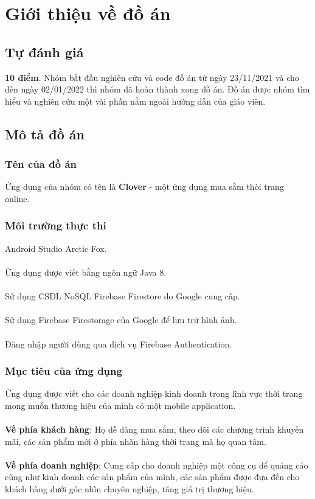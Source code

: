 \documentclass[12pt]{article}
\begin{document}
\section{Giới thiệu về đồ án}
\subsection{Tự đánh giá}
\textbf{10 điểm}. Nhóm bắt đầu nghiên cứu và code đồ án từ ngày 23/11/2021 và cho đến ngày 02/01/2022 thì nhóm đã hoàn thành xong đồ án. Đồ án được nhóm tìm hiểu và nghiên cứu một vài phần nằm ngoài hướng dẫn của giáo viên.

\subsection{Mô tả đồ án}
\subsubsection{Tên của đồ án}

Ứng dụng của nhóm có tên là \textbf{Clover} - một ứng dụng mua sắm thòi trang online.

\subsubsection{Môi trường thực thi}
Android Studio Arctic Fox.\\\\
\indent Ứng dụng được viết bằng ngôn ngữ Java 8.\\\\
\indent Sử dụng CSDL NoSQL Firebase Firestore do Google cung cấp.\\\\
\indent Sử dụng Firebase Firestorage của Google để lưu trữ hình ảnh.\\\\
\indent Đăng nhập người dùng qua dịch vụ Firebase Authentication.

\subsubsection{Mục tiêu của ứng dụng}
Ứng dụng được viết cho các doanh nghiệp kinh doanh trong lĩnh vực thời trang mong muốn thương hiệu của mình có một mobile application.\\\\
\indent \textbf{Về phía khách hàng}: Họ dễ dàng mua sắm, theo dõi các chương trình khuyến mãi, các sản phẩm mới ở phía nhãn hàng thời trang mà họ quan tâm.\\\\
\indent \textbf{Về phía doanh nghiệp}: Cung cấp cho doanh nghiệp một công cụ để quảng cáo cũng như kinh doanh các sản phẩm của mình, các sản phẩm được đưa đến cho khách hàng dưới góc nhìn chuyên nghiệp, tăng giá trị thương hiệu.
\end{document}
